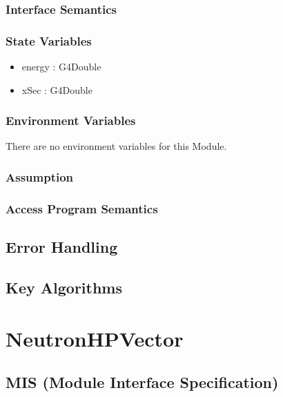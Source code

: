 \documentclass[12pt]{article}
\begin{document}
\subsubsection{Interface Semantics}

\subsubsection{State Variables}%
\begin{itemize}
\item energy : G4Double
\item xSec : G4Double
\end{itemize}

\subsubsection{Environment Variables}%
There are no environment variables for this Module.

\subsubsection{Assumption}%

\subsubsection{Access Program Semantics}%

\subsection{Error Handling}

\subsection{Key Algorithms}


\section{NeutronHPVector}

\subsection{MIS (Module Interface Specification)}
\end{document}
